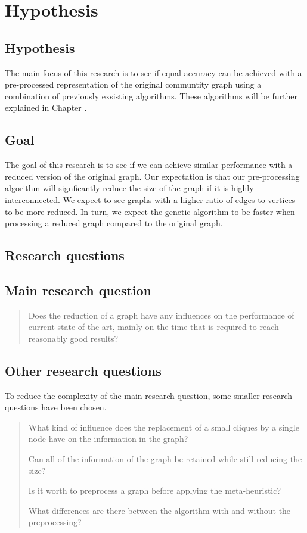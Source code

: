 \section{Hypothesis}
\label{sec:hypothesis}

\subsection{Hypothesis}
The main focus of this research is to see if equal accuracy can be achieved with a pre-processed representation of the original communtity graph using a combination of previously exsisting algorithms.
These algorithms will be further explained in Chapter \cite{chapter:relevantResearch}.


\subsection{Goal}
The goal of this research is to see if we can achieve similar performance with a reduced version of the original graph. Our expectation is that our pre-processing algorithm will signficantly reduce the size of the graph if it is highly interconnected. We expect to see graphs with a higher ratio of edges to vertices to be more reduced. In turn, we expect the genetic algorithm to be faster when processing a reduced graph compared to the original graph.


\subsection{Research questions}
\subsection*{Main research question}
\begin{quote}
Does the reduction of a graph have any influences on the performance of current state of the art, mainly on the time that is required to reach reasonably good results?
\end{quote}
\subsection*{Other research questions}
To reduce the complexity of the main research question, some smaller research questions have been chosen.
\begin{quote}
What kind of influence does the replacement of a small cliques by a single node have on the information in the graph?

Can all of the information of the graph be retained while still reducing the size?

Is it worth to preprocess a graph before applying the meta-heuristic?

What differences are there between the algorithm with and without the preprocessing?
\end{quote}
